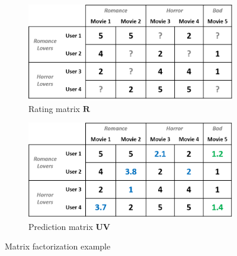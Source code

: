 \documentclass[master,english,final]{kaist-ucs}
\begin{document}
\begin{figure}[t]
    \centering
    \begin{subfigure}[b]{0.45\textwidth}
        \centering
        \includegraphics[width=\textwidth]{figure/mf_before_rating}
        \caption{Rating matrix $\bm{R}$}
        \label{mf_before_rating}
    \end{subfigure}
    \begin{subfigure}[b]{0.45\textwidth}
        \centering
        \includegraphics[width=\textwidth]{figure/mf_before_prediction}
        \caption{Prediction matrix $\bm{UV}$}
        \label{mf_before_prediction}
    \end{subfigure}
    \caption{Matrix factorization example}
    \label{mf_base}
\end{figure}
\end{document}
